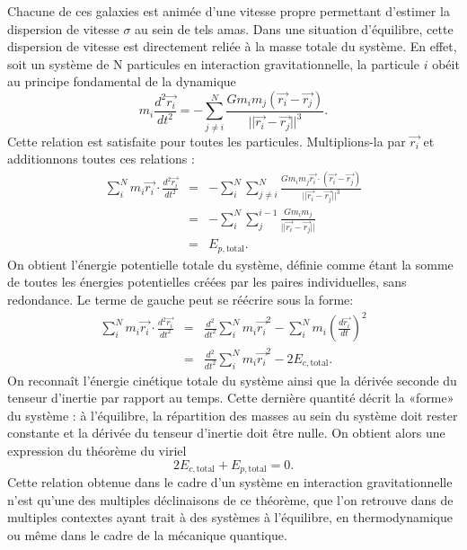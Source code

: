 Chacune de ces galaxies est animée d'une vitesse propre permettant d'estimer la dispersion de vitesse $\sigma$ au sein de tels amas. Dans une situation d'équilibre, cette dispersion de vitesse est directement reliée à la masse totale du système. En effet, soit un système de N particules en interaction gravitationnelle, la particule $i$ obéit au principe fondamental de la dynamique
\begin{equation}
m_i\frac{d^2 \vec{r_i}}{dt^2}=-\sum_{j\neq i}^N \frac{Gm_i m_j (\vec{r_i}-\vec{r_j})}{||\vec{r_i}-\vec{r_j}||^3}.
\end{equation}
Cette relation est satisfaite pour toutes les particules. Multiplions-la par $\vec{r_i}$ et additionnons toutes ces relations :
\begin{eqnarray}
\sum_i^N m_i\vec{r_i}\cdot\frac{d^2 \vec{r_i}}{dt^2}&=&-\sum_i^N \sum_{j\neq i}^N \frac{Gm_i m_j \vec{r_i}\cdot (\vec{r_i}-\vec{r_j})}{||\vec{r_i}-\vec{r_j}||^3}\\
&=& -\sum_i^N \sum_j^{i-1}\frac{Gm_i m_j}{||\vec{r_i}-\vec{r_j}||}\\
&=&E_{p,\mathrm{total}}.
\end{eqnarray}
On obtient l'énergie potentielle totale du système, définie comme étant la somme de toutes les énergies potentielles créées par les paires individuelles, sans redondance. Le terme de gauche peut se réécrire sous la forme:
\begin{eqnarray}
\sum_i^N m_i\vec{r_i}\cdot\frac{d^2 \vec{r_i}}{dt^2}&=&\frac{d^2}{dt^2}\sum_i^N m_i \vec{r_i}^2 - \sum_i^N m_i \left(\frac{d \vec{r_i}}{dt}\right)^2\\
&=&\frac{d^2}{dt^2}\sum_i^N m_i \vec{r_i}^2 - 2E_{c,\mathrm{total}}.
\end{eqnarray}
On reconnaît l'énergie cinétique totale du système ainsi que la dérivée seconde du tenseur d'inertie par rapport au temps. Cette dernière quantité décrit la «forme» du système : à l'équilibre, la répartition des masses au sein du système doit rester constante et la dérivée du tenseur d'inertie doit être nulle. On obtient alors une expression du théorème du viriel
\begin{equation}
2E_{c,\mathrm{total}} + E_{p,\mathrm{total}} =0.
\end{equation}
Cette relation obtenue dans le cadre d'un système en interaction gravitationnelle n'est qu'une des multiples déclinaisons de ce théorème, que l'on retrouve dans de multiples contextes ayant trait à des systèmes à l'équilibre, en thermodynamique ou même dans le cadre de la mécanique quantique.

